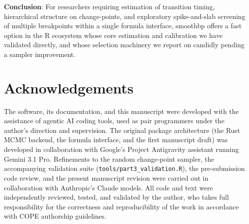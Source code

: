 \documentclass[12pt]{article}
\newcommand{\pkg}[1]{\textsf{#1}}
\newcommand{\code}[1]{\texttt{#1}}
\begin{document}
\textbf{Conclusion}: For researchers requiring estimation of transition timing, hierarchical structure on change-points, and exploratory spike-and-slab screening of multiple breakpoints within a single formula interface, \pkg{smoothbp} offers a fast option in the R ecosystem whose core estimation and calibration we have validated directly, and whose selection machinery we report on candidly pending a sampler improvement.

\section*{Acknowledgements}

The software, its documentation, and this manuscript were developed with the assistance of agentic AI coding tools, used as pair programmers under the author's direction and supervision. The original package architecture (the Rust MCMC backend, the formula interface, and the first manuscript draft) was developed in collaboration with Google's Project Antigravity assistant running Gemini 3.1 Pro. Refinements to the random change-point sampler, the accompanying validation suite (\code{tools/part3\_validation.R}), the pre-submission code review, and the present manuscript revision were carried out in collaboration with Anthropic's Claude models. All code and text were independently reviewed, tested, and validated by the author, who takes full responsibility for the correctness and reproducibility of the work in accordance with COPE authorship guidelines.
\end{document}
